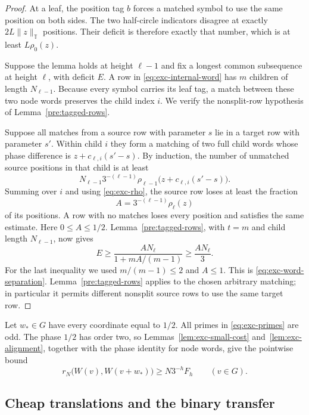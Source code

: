 \begin{proof}
At a leaf, the position tag $b$ forces a matched symbol to use the same
position on both sides.  The two half-circle indicators disagree at
exactly $2L\|z\|_{\mathbb T}$ positions.  Their deficit is therefore
exactly that number, which is at least $L\rho_0(z)$.

Suppose the lemma holds at height $\ell-1$ and fix a longest common
subsequence at height $\ell$, with deficit $E$.  A row in
\eqref{eq:exc-internal-word} has $m$ children of length $N_{\ell-1}$.
Because every symbol carries its leaf tag, a match between these two node
words preserves the child index $i$.  We verify the nonsplit-row hypothesis
of Lemma~\ref{pre:tagged-rows}.

Suppose all matches from a source row with parameter $s$ lie in a target
row with parameter $s'$.  Within child $i$ they form a matching of two full
child words whose phase difference is
$z+c_{\ell,i}(s'-s)$.  By induction, the number of unmatched source
positions in that child is at least
\[
 N_{\ell-1}3^{-(\ell-1)}
       \rho_{\ell-1}\bigl(z+c_{\ell,i}(s'-s)\bigr).
\]
Summing over $i$ and using \eqref{eq:exc-rho}, the source row loses at least
the fraction
\[
 A=3^{-(\ell-1)}\rho_\ell(z)
\]
of its positions.  A row with no matches loses every position and satisfies
the same estimate.  Here $0\le A\le1/2$.  Lemma~\ref{pre:tagged-rows},
with $t=m$ and child length $N_{\ell-1}$, now gives
\[
 E\ge\frac{A N_\ell}{1+mA/(m-1)}
   \ge \frac{A N_\ell}{3}.
\]
For the last inequality we used $m/(m-1)\le2$ and $A\le1$.  This is
\eqref{eq:exc-word-separation}.  Lemma~\ref{pre:tagged-rows} applies to the
chosen arbitrary matching; in particular it permits different nonsplit
source rows to use the same target row.
\end{proof}

Let $w_*\in G$ have every coordinate equal to $1/2$.  All primes in
\eqref{eq:exc-primes} are odd.  The phase $1/2$ has order two, so
Lemmas~\ref{lem:exc-small-cost} and~\ref{lem:exc-alignment}, together with
the phase identity for node words, give the pointwise bound
\begin{equation}\label{eq:exc-halfturn}
 r_N\bigl(W(v),W(v+w_*)\bigr)\ge N3^{-h}F_h
 \qquad(v\in G).
\end{equation}

\subsection{Cheap translations and the binary transfer}

